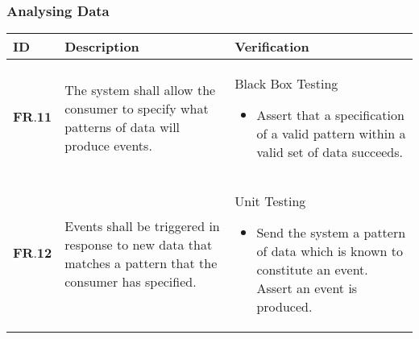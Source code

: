 \subsubsection{Analysing Data}
\begin{longtable}[H]{| p{1.5cm} | p{4.5cm} | p{10.5cm} |}
        \hline
        \cellcolor{titleColor}\textbf{ID}    & \cellcolor{titleColor}\textbf{Description}                                                                                      & \cellcolor{titleColor}\textbf{Verification}                                                                                                                                     \\ \hline
        $\textbf{FR.11}$ & The system shall allow the consumer to specify what patterns of data will produce events.                 & Black Box Testing\begin{itemize} \item Assert that a specification of a valid pattern within a valid set of data succeeds.\end{itemize}              \\ \hline
        $\textbf{FR.12}$ & Events shall be triggered in response to new data that matches a pattern that the consumer has specified. & Unit Testing\begin{itemize} \item Send the system a pattern of data which is known to constitute an event. Assert an event is produced.\end{itemize} \\ \hline
\end{longtable}



